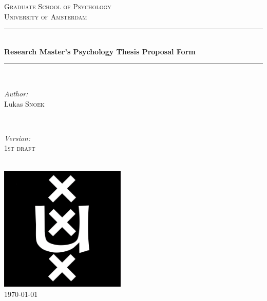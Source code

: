 \documentclass[12pt,a4paper]{article}\usepackage[]{graphicx}\usepackage[]{color}
\begin{document}
\begin{titlepage}

\newcommand{\HRule}{\rule{\linewidth}{0.5mm}} 
\center 

\textsc{\LARGE Graduate School of Psychology}\\[1cm] 
\textsc{\Large University of Amsterdam}\\[1cm]

\HRule \\[0.4cm]
{ \huge \bfseries Research Master's Psychology Thesis Proposal Form}\\[0.4cm] 
\HRule \\[1.5cm]
 
\begin{minipage}{0.4\textwidth}
\begin{flushleft} \large
\emph{Author:}\\
Lukas \textsc{Snoek} 
\end{flushleft}
\end{minipage}
~
\begin{minipage}{0.4\textwidth}
\begin{flushright} \large
\emph{Version:} \\
\textsc{1st draft} 
\end{flushright}
\end{minipage}\\[2cm]

\includegraphics[width=60mm]{uva_logo3}\\[2cm] 

{\large \today}\\[3cm]

\vfill 

\end{titlepage}

\end{document}
